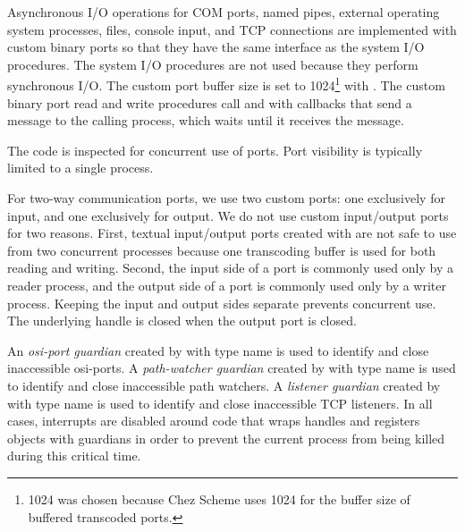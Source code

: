 Asynchronous I/O operations for COM ports, named pipes, external
operating system processes, files, console input, and TCP connections
are implemented with custom binary ports so that they have the same
interface as the system I/O procedures. The system I/O procedures are
not used because they perform synchronous I/O.  The custom port buffer
size is set to 1024\footnote{1024 was chosen because Chez Scheme uses
  1024 for the buffer size of buffered transcoded ports.} with
.  The custom binary port read and write
procedures call  and 
with callbacks that send a message to the calling process, which waits
until it receives the message.

  \mitigation The code is
inspected for concurrent use of ports. Port visibility is typically
limited to a single process.

For two-way communication ports, we use two custom ports: one
exclusively for input, and one exclusively for output. We do not use
custom input/output ports for two reasons.  First, textual
input/output ports created with  are not safe
to use from two concurrent processes because one transcoding buffer is
used for both reading and writing.  Second, the input side of a port
is commonly used only by a reader process, and the output side of a
port is commonly used only by a writer process.  Keeping the input and
output sides separate prevents concurrent use. The underlying handle
is closed when the output port is closed.

  \mitigation An
\emph{osi-port guardian}
created by  with type name 
is used to identify and close inaccessible osi-ports.
A \emph{path-watcher guardian}
created by  with type name 
is used to identify and close inaccessible path
watchers.  A \emph{listener
  guardian}
created by  with type name 
is used to identify and close inaccessible TCP listeners. In all cases, interrupts are disabled around code that
wraps handles and registers objects with guardians in order to prevent
the current process from being killed during this critical time.

